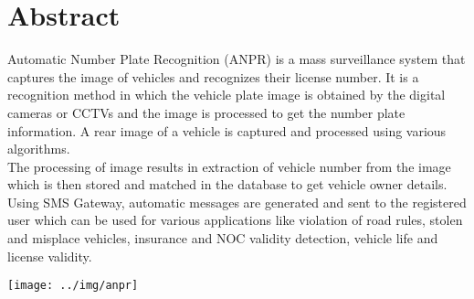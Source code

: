 \chapter*{Abstract}
\thispagestyle{plain} 

Automatic Number Plate Recognition (ANPR) is a mass surveillance system that captures the image of vehicles and recognizes their license number. It is a recognition method in which the vehicle plate image is obtained by the digital cameras or CCTVs and the image is processed to get the number plate information. A rear image of a vehicle is captured and processed using various algorithms.\\
The processing of image results in extraction of vehicle number from the image which is then stored and matched in the database to get vehicle owner details. Using SMS Gateway, automatic messages are generated and sent to the registered user which can be used for various applications like violation of road rules, stolen and misplace vehicles, insurance and NOC validity detection, vehicle life and license validity.

\vspace{10mm} 
\begin{center} 
\texttt{[image: ../img/anpr]} \\[20mm]
\end{center}  